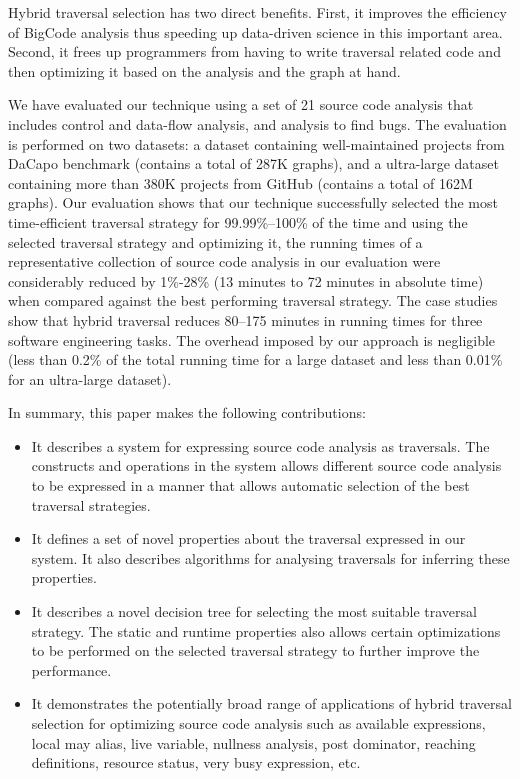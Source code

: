 Hybrid traversal selection has two direct benefits. First, it improves the 
efficiency of BigCode analysis thus speeding up data-driven science in this important area.
Second, it frees up programmers from having to write traversal related code 
and then optimizing it based on the analysis and the graph at hand. 

We have evaluated our technique using a set of 21 source code analysis that
includes control and data-flow analysis, and analysis to find bugs. The
evaluation is performed on two datasets: a dataset containing well-maintained
projects from DaCapo benchmark (contains a total of 287K graphs), and a
ultra-large dataset containing more than 380K projects from GitHub (contains a
total of 162M graphs). Our evaluation shows that our technique successfully selected
the most time-efficient traversal strategy for 99.99\%--100\% of the time and
using the selected traversal strategy and optimizing it, the running times of a
representative collection of source code analysis in our evaluation
were considerably reduced by 1\%-28\% (13 minutes to 72 minutes in absolute time) when compared against the best performing traversal strategy. The case studies show that hybrid traversal reduces 80--175 minutes in running times for three software engineering tasks.
The overhead imposed by our approach is negligible (less than 0.2\% of the total 
running time for a large dataset and less than 0.01\% for an ultra-large dataset). 

In summary, this paper makes the following contributions:
\begin{itemize}
	\item It describes a system for expressing source code analysis as traversals. The
	constructs and operations in the system allows different source code analysis to
	be expressed in a manner that allows automatic selection of the best traversal
	strategies.
	\item It defines a set of novel properties about the traversal expressed 
	in our system. It also describes algorithms for analysing traversals for inferring 
	these properties. 
	\item It describes a novel decision tree for selecting the most suitable traversal 
	strategy. The static and runtime properties also allows
	certain optimizations to be performed on the selected traversal strategy to
	further improve the performance.
	\item It demonstrates the potentially broad range of applications of
	hybrid traversal selection for optimizing source code analysis such
	as available expressions, local may alias, live variable, nullness
	analysis, post dominator, reaching definitions, resource status,
	very busy expression, etc.
\end{itemize} 

